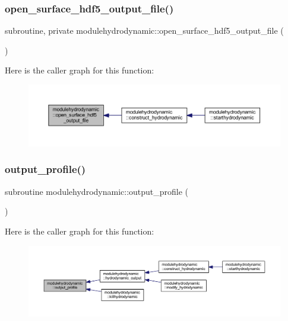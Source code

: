 \subsubsection{\texorpdfstring{open\+\_\+surface\+\_\+hdf5\+\_\+output\+\_\+file()}{open\_surface\_hdf5\_output\_file()}}
{\footnotesize\ttfamily subroutine, private modulehydrodynamic\+::open\+\_\+surface\+\_\+hdf5\+\_\+output\+\_\+file (\begin{DoxyParamCaption}{ }\end{DoxyParamCaption})\hspace{0.3cm}{\ttfamily [private]}}

Here is the caller graph for this function\+:\nopagebreak
\begin{figure}[H]
\begin{center}
\leavevmode
\includegraphics[width=350pt]{namespacemodulehydrodynamic_a8cd8ea126b12cb779766bcdbe905b6b0_icgraph}
\end{center}
\end{figure}
\mbox{\label{namespacemodulehydrodynamic_aad9764fae86ae409938db759114d0a42}} 
\subsubsection{\texorpdfstring{output\+\_\+profile()}{output\_profile()}}
{\footnotesize\ttfamily subroutine modulehydrodynamic\+::output\+\_\+profile (\begin{DoxyParamCaption}{ }\end{DoxyParamCaption})\hspace{0.3cm}{\ttfamily [private]}}

Here is the caller graph for this function\+:\nopagebreak
\begin{figure}[H]
\begin{center}
\leavevmode
\includegraphics[width=350pt]{namespacemodulehydrodynamic_aad9764fae86ae409938db759114d0a42_icgraph}
\end{center}
\end{figure}
\mbox{\label{namespacemodulehydrodynamic_ab09a29c4bbdb3a0c03a3e8630b2d0829}} 
